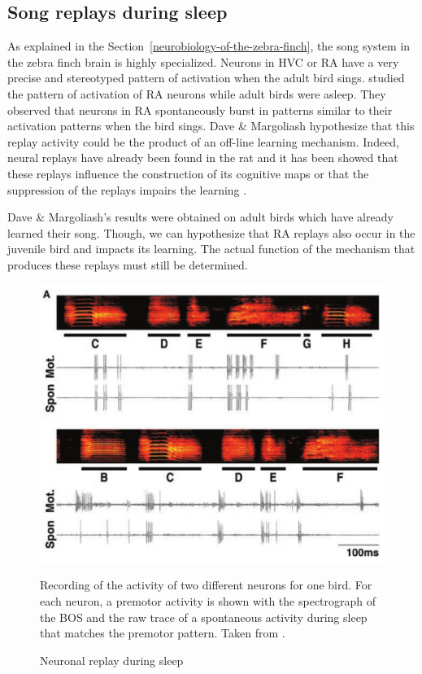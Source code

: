 \documentclass{report}
\begin{document}
\subsection{Song replays during sleep}
\label{song-replays-sleep}

As explained in the Section~\ref{neurobiology-of-the-zebra-finch}, the song
system in the zebra finch brain is highly specialized. Neurons in HVC or RA have
a very precise and stereotyped pattern of activation when the adult bird sings.
\textcite{dave_song_2000} studied the pattern of activation of RA neurons while
adult birds were asleep. They observed that neurons in RA spontaneously burst in
patterns similar to their activation patterns when the bird sings. Dave \&
Margoliash hypothesize that this replay activity could be the product of an
off-line learning mechanism. Indeed, neural replays have already been found in
the rat and it has been showed that these replays influence the construction of
its cognitive maps \parencite{de_lavilleon_explicit_2015} or that the
suppression of the replays impairs the learning
\parencite{girardeau_selective_2009}.

Dave \& Margoliash's results were obtained on adult birds which have already
learned their song. Though, we can hypothesize that RA replays also occur in the
juvenile bird and impacts its learning. The actual function of the mechanism
that produces these replays must still be determined.

\begin{figure}[tbph]
  {\center
  \includegraphics[width=0.7\linewidth]{media/replays_bird_margoliash}
  \caption{Neuronal replay during sleep}
  }
  \small
  Recording of the activity of two different neurons for one bird. For each
  neuron, a premotor activity is shown with the spectrograph of the BOS and the
  raw trace of a spontaneous activity during sleep that
  matches the premotor pattern. Taken from \textcite{dave_song_2000}.

\end{figure}
\end{document}
